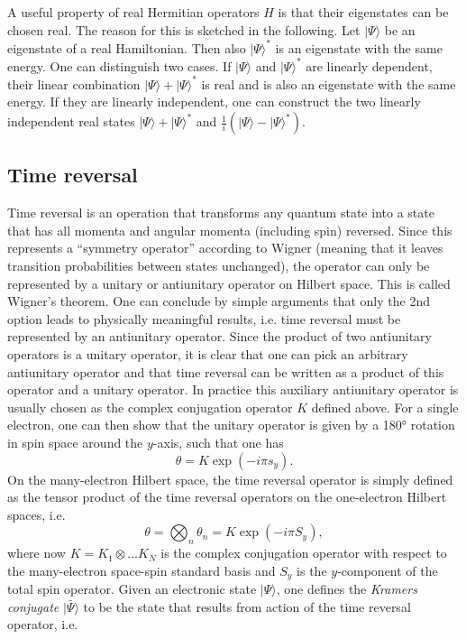 A useful property of real Hermitian operators $H$ is that their eigenstates can be chosen real. The reason for this is sketched in the following. Let $|\Psi\rangle$ be an eigenstate of a real Hamiltonian. Then also $|\Psi\rangle^\ast$ is an eigenstate with the same energy. One can distinguish two cases. If $|\Psi\rangle$ and $|\Psi\rangle^\ast$ are linearly dependent, their linear combination $|\Psi\rangle+|\Psi\rangle^\ast$ is real and is also an eigenstate with the same energy. If they are linearly independent, one can construct the two linearly independent real states $|\Psi\rangle+|\Psi\rangle^\ast$ and $\frac{1}{i}(|\Psi\rangle-|\Psi\rangle^\ast)$.

\subsection{Time reversal}
\label{Sec:TimeReversal}
Time reversal is an operation that transforms any quantum state into a state that has all momenta and angular momenta (including spin) reversed. Since this represents a ``symmetry operator'' according to Wigner (meaning that it leaves transition probabilities between states unchanged), the operator can only be represented by a unitary or antiunitary operator on Hilbert space. This is called Wigner's theorem. One can conclude by simple arguments that only the 2nd option leads to physically meaningful results, i.e. time reversal must be represented by an antiunitary operator.\cite{AbragB_2012_}\cite{Weinb_1995_} Since the product of two antiunitary operators is a unitary operator, it is clear that one can pick an arbitrary antiunitary operator and that time reversal can be written as a product of this operator and a unitary operator. In practice this auxiliary antiunitary operator is usually chosen as the complex conjugation operator $K$ defined above. For a single electron, one can then show that the unitary operator is given by a 180° rotation in spin space around the $y$-axis, such that one has
\begin{equation}
\theta = K \exp(-i\pi s_y).
\end{equation}
On the many-electron Hilbert space, the time reversal operator is simply defined as the tensor product of the time reversal operators on the one-electron Hilbert spaces, i.e.
\begin{equation}
\theta = \bigotimes_n \theta_n = K\exp(-i\pi S_y),
\end{equation}
where now $K=K_1\otimes \dots K_N$ is the complex conjugation operator with respect to the many-electron space-spin standard basis and $S_y$ is the $y$-component of the total spin operator. Given an electronic state $|\Psi\rangle$, one defines the \emph{Kramers conjugate} $|\bar\Psi\rangle$ to be the state that results from action of the time reversal operator, i.e.
